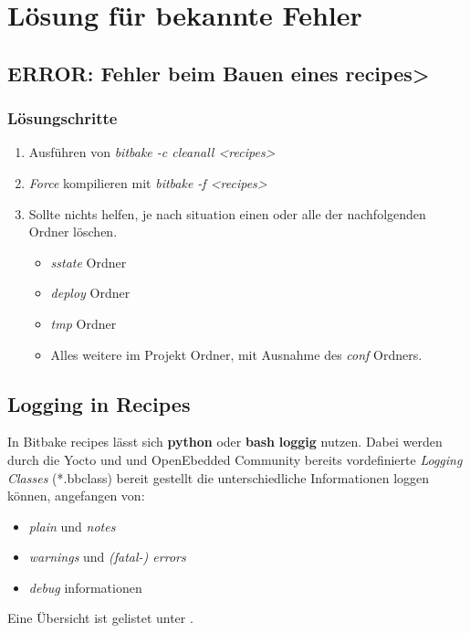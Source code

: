 \chapter{Lösung für bekannte Fehler}%
\label{cha:losung_fur_bekannte_fehler}


\section{\textbf{ERROR:} Fehler beim Bauen eines recipes>}
\label{sec:fehler_beim_bauen_eines_images}


\subsection{Lösungschritte}%
\label{sub:loesungsschritte}


\begin{enumerate}
    \item Ausführen von \textit{bitbake -c cleanall <recipes>}
    \item \textit {Force} kompilieren mit  \textit{bitbake -f <recipes>}
    \item Sollte nichts helfen, je nach situation einen oder alle der
        nachfolgenden Ordner löschen.
    \begin{itemize}
        \item \textit{sstate} Ordner
        \item \textit{deploy} Ordner
        \item \textit{tmp} Ordner
        \item Alles weitere im Projekt Ordner, mit Ausnahme des \textit{conf}
            Ordners.
    \end{itemize}
\end{enumerate}



\section{Logging in Recipes}%
\label{sec:logging}
In Bitbake recipes lässt sich \textbf{python} oder \textbf{bash} \textbf{loggig}
nutzen. Dabei werden durch die Yocto und und OpenEbedded Community bereits
vordefinierte \textit{Logging Classes} (*.bbclass) bereit gestellt die
unterschiedliche Informationen loggen können, angefangen von:
\begin{itemize}
    \item \textit{plain} und \textit{notes}
    \item \textit{warnings} und \textit{(fatal-) errors}
    \item \textit{debug} informationen
\end{itemize}
 Eine Übersicht ist gelistet unter
 \cite[S.79-80]{Gonzalez2018:Embedded_Linux_Development_Using_Yocto_Project_Cookbook_2nd}.


